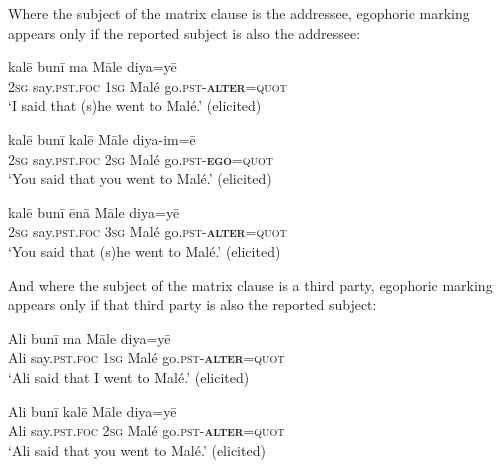 \documentclass[output=paper]{langsci/langscibook}
\begin{document}
 Where the subject of the matrix clause is the addressee, egophoric marking appears only if the reported subject is also the addressee:
 
 
\begin{exe}
	\ex 	\label{ex:jl18}
	\gll kalē bunī ma Māle diya=yē\\
	2\textsc{sg} say.\textsc{pst}.\textsc{foc} 1\textsc{sg} Malé go.\textsc{pst}-\textbf{\textsc{alter}}=\textsc{quot}\\
	\trans ‘I said that (s)he went to Malé.’ (elicited)
\end{exe}

\begin{exe}
	\ex 	\label{ex:jl19}
	\gll kalē bunī kalē Māle diya-im=ē\\
	2\textsc{sg} say.\textsc{pst}.\textsc{foc} 2\textsc{sg} Malé go.\textsc{pst}-\textbf{\textsc{ego}}=\textsc{quot}\\
	\trans ‘You said that you went to Malé.’ (elicited)
\end{exe}

\begin{exe}
	\ex 	\label{ex:jl20}
	\gll kalē bunī ēnā Māle diya=yē\\
	2\textsc{sg} say.\textsc{pst}.\textsc{foc} 3\textsc{sg} Malé go.\textsc{pst}-\textbf{\textsc{alter}}=\textsc{quot}\\
	\trans ‘You said that (s)he went to Malé.’ (elicited)
\end{exe}

And where the subject of the matrix clause is a third party, egophoric marking appears only if that third party is also the reported subject:

\begin{exe}
	\ex 	\label{ex:jl21}
	\gll Ali bunī ma Māle diya=yē\\
	Ali say.\textsc{pst}.\textsc{foc} 1\textsc{sg} Malé go.\textsc{pst}-\textbf{\textsc{alter}}=\textsc{quot}\\
	\trans ‘Ali said that I went to Malé.’ (elicited)
\end{exe}

\begin{exe}
	\ex 	\label{ex:jl22}
	\gll Ali bunī kalē Māle diya=yē\\
	Ali say.\textsc{pst}.\textsc{foc} 2\textsc{sg} Malé go.\textsc{pst}-\textbf{\textsc{alter}}=\textsc{quot}\\
	\trans ‘Ali said that you went to Malé.’ (elicited)
\end{exe}
\end{document}
